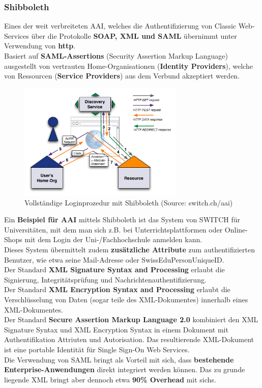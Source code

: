 \subsubsection{Shibboleth}
Eines der weit verbreiteten AAI, welches die Authentifizierung von Classic Web-Services über die Protokolle \textbf{SOAP, XML und SAML} übernimmt unter Verwendung von \textbf{http}.\\
Basiert auf \textbf{SAML-Assertions} (Security Assertion Markup Language) ausgestellt von vertrauten Home-Organisationen (\textbf{Identity Providers}), welche von Ressourcen (\textbf{Service Providers}) aus dem Verbund akzeptiert werden.

\begin{figure}[H]
	\centering
	\includegraphics[width=0.7\textwidth]{./img/shibboleth-login}
	\caption{Vollständige Loginprozedur mit Shibboleth (Source: switch.ch/aai)}
\end{figure}

Ein \textbf{Beispiel für AAI} mittels Shibboleth ist das System von SWITCH für Universitäten, mit dem man sich z.B. bei Unterrichtsplattformen oder Online-Shops mit dem Login der Uni-/Fachhochschule anmelden kann.\\
Dieses System übermittelt zudem \textbf{zusätzliche Attribute} zum authentifizierten Benutzer, wie etwa seine Mail-Adresse oder SwissEduPersonUniqueID.\\

Der Standard \textbf{XML Signature Syntax and Processing} erlaubt die Signierung, Integritätsprüfung und Nachrichtenauthentifizierung.\\
Der Standard \textbf{XML Encryption Syntax and Processing} erlaubt die Verschlüsselung von Daten (sogar teile des XML-Dokumentes) innerhalb eines XML-Dokumentes.\\
Der Standard \textbf{Secure Assertion Markup Language 2.0} kombiniert den XML Signature Syntax und XML Encryption Syntax in einem Dokument mit Authentifikation Attriuten und Autorisation. Das resultierende XML-Dokument ist eine portable Identität für Single Sign-On Web Services.\\
Die Verwendung von SAML bringt als Vorteil mit sich, dass \textbf{bestehende Enterprise-Anwendungen} direkt integriert werden können. Das zu grunde liegende XML bringt aber dennoch etwa \textbf{90\% Overhead} mit sichs.\\

